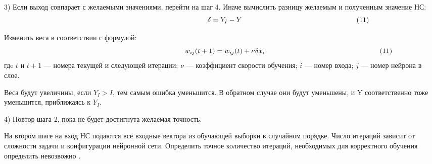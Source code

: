 \documentclass[a4paper,english,russian]{G2-105}
\begin{document}
\par 3) Если выход совпарает с желаемыми значениями, перейти на шаг 4.
Иначе вычислить разницу желаемым и полученным значение НС:
\[
\ \hspace*{66mm} \delta=Y_I-Y \ \hspace*{56mm} (11)
\] 
\par Изменить веса в соответствии с формулой:
\[
\ \hspace*{66mm} w_{ij}(t+1)=w_{ij}(t)+\nu        \delta x_i \ \hspace*{56mm} (11)
\]
гдe $t$ и $t+1$ --- номера текущей и следующей итерации; $\nu$ --- коэффициент скорости обучения; $i$ --- номер входа; $j$ --- номер нейрона в слое.
\par Веса будут увеличины, если $Y_I>I$, тем самым ошибка уменьшится. В обратном случае они будут уменьшены, и Y соответственно тоже уменьшится, приближаясь к $Y_I$.
\par 4) Повтор шага 2, пока не будет достигнута желаемая точность.
\par На втором шаге на вход НС подаются все входные вектора из обучающей выборки в случайном порядке. Число итераций зависит от сложности задачи и конфигурации нейронной сети. Определить точное количество итераций, необходимых для корректного обучения определить невозвожно \cite{14}. 
\ttl
\end{document}

